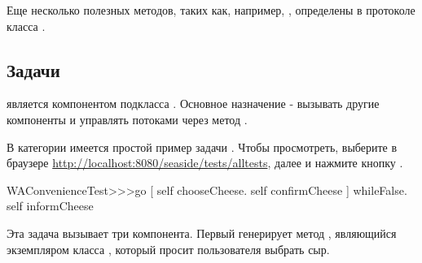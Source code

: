 \documentclass[a4paper,10pt,twoside]{book}
\begin{document}

Еще несколько полезных методов, таких как, например,
,
определены в протоколе 
класса .


\subsection{Задачи}


 является компонентом подкласса .
Основное назначение - вызывать другие компоненты и управлять потоками
через метод .


В категории  имеется простой пример задачи
.
Чтобы просмотреть,
выберите в браузере \url{http://localhost:8080/seaside/tests/alltests},
далее  и нажмите кнопку .

\begin{code}{}
WAConvenienceTest>>>go
	[ self chooseCheese.
	  self confirmCheese ] whileFalse.
	self informCheese
\end{code}


Эта задача вызывает три компонента.
Первый генерирует метод ,
являющийся экземпляром класса ,
который просит пользователя выбрать сыр.
\end{document}
